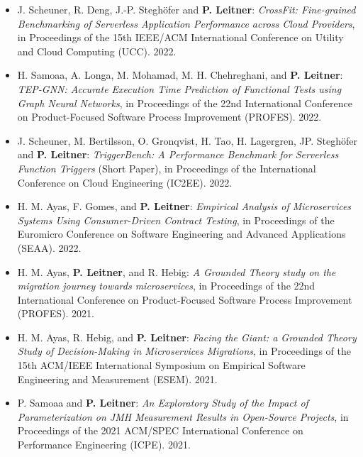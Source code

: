 \documentclass[paper=letter,fontsize=11pt]{scrartcl} %
\begin{document}
\begin{itemize}
  \item J. Scheuner, R. Deng, J.-P. Steghöfer and \textbf{P. Leitner}: \emph{CrossFit: Fine-grained Benchmarking of Serverless Application Performance across Cloud Providers}, in Proceedings of the 15th IEEE/ACM International Conference on Utility and Cloud Computing (UCC). 2022.
  \item H. Samoaa, A. Longa, M. Mohamad, M. H. Chehreghani, and \textbf{P. Leitner}: \emph{TEP-GNN: Accurate Execution Time Prediction of Functional Tests using Graph Neural Networks}, in Proceedings of the 22nd International Conference on Product-Focused Software Process Improvement (PROFES). 2022.
  \item  J. Scheuner, M. Bertilsson, O. Gronqvist, H. Tao, H. Lagergren, JP. Steghöfer and \textbf{P. Leitner}: \emph{TriggerBench: A Performance Benchmark for Serverless Function Triggers} (Short Paper), in Proceedings of the International Conference on Cloud Engineering (IC2EE). 2022.
  \item H. M. Ayas, F. Gomes, and \textbf{P. Leitner}: \emph{Empirical Analysis of Microservices Systems Using Consumer-Driven Contract Testing}, in Proceedings of the Euromicro Conference on Software Engineering and Advanced Applications (SEAA). 2022.
  \item H. M. Ayas, \textbf{P. Leitner}, and R. Hebig: \emph{A Grounded Theory study on the migration journey towards microservices}, in Proceedings of the 22nd International Conference on Product-Focused Software Process Improvement (PROFES). 2021.
  \item H. M. Ayas, R. Hebig, and \textbf{P. Leitner}: \emph{Facing the Giant: a Grounded Theory Study of Decision-Making in Microservices Migrations}, in Proceedings of the 15th ACM/IEEE International Symposium on Empirical Software Engineering and Measurement (ESEM). 2021.
  \item P. Samoaa and \textbf{P. Leitner}: \emph{An Exploratory Study of the Impact of Parameterization on JMH Measurement Results in Open-Source Projects}, in Proceedings of the 2021 ACM/SPEC  International Conference on Performance Engineering (ICPE). 2021.  
\end{itemize}
\end{document}
